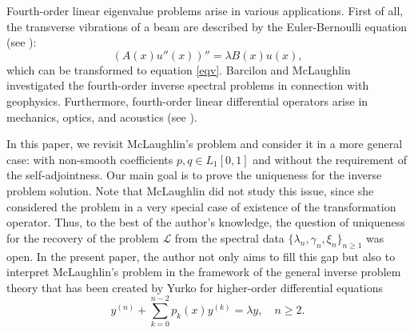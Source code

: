 \documentclass[a4paper,12pt]{article}
\newcommand{\ga}{\gamma}
\newcommand{\la}{\lambda}
\theoremstyle{plain}
\numberwithin{equation}{section}
\theoremstyle{definition}
\theoremstyle{remark}
\begin{document}
Fourth-order linear eigenvalue problems arise in various applications. First of all, the transverse vibrations of a beam are described by the Euler-Bernoulli equation (see \cite{Glad05}):
$$
(A(x) u''(x))'' = \la B(x) u(x),
$$
which can be transformed to equation \eqref{eqv}. Barcilon \cite{Bar74-1} and McLaughlin \cite{McL86} investigated the fourth-order inverse spectral problems in connection with geophysics. Furthermore, fourth-order linear differential operators arise in mechanics, optics, and acoustics (see \cite{Mikh64, YS72, Pol20}).

In this paper, we revisit McLaughlin's problem and consider it in a more general case: with non-smooth coefficients $p, q \in L_1[0,1]$ and without the requirement of the self-adjointness. Our main goal is to prove the uniqueness for the inverse problem solution. Note that McLaughlin \cite{McL82, McL84, McL86} did not study this issue, since she considered the problem in a very special case of existence of the transformation operator. Thus, to the best of the author's knowledge, the question of uniqueness for the recovery of the problem $\mathcal L$ from the spectral data $\{ \la_n, \ga_n, \xi_n \}_{n \ge 1}$ was open. In the present paper, the author not only aims to fill this gap but also to interpret McLaughlin's problem in the framework of the general inverse problem theory that has been created by Yurko \cite{Yur00, Yur02, Yur92, Yur93, Yur95} for higher-order differential equations 
\begin{equation} \label{ho}
y^{(n)} + \sum_{k = 0}^{n-2} p_k(x) y^{(k)} = \la y, \quad n \ge 2.
\end{equation}
\end{document}
